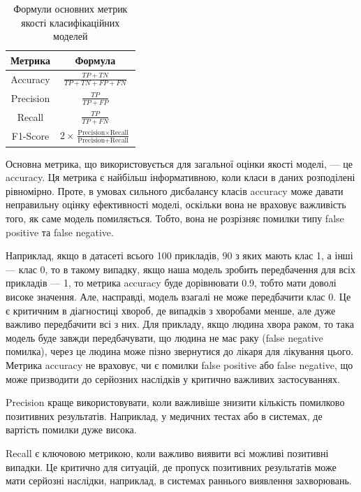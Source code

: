 \begin{table}[ht]
	\setfontsize{14pt}
	\centering
	\begin{tabular}{|c|c|}
		\hline
		Метрика & Формула \\
		\hline
		Accuracy & $\frac{TP + TN}{TP + TN + FP + FN}$ \\
		\hline
		Precision & $\frac{TP}{TP + FP}$ \\
		\hline
		Recall & $\frac{TP}{TP + FN}$ \\
		\hline
		F1-Score & $2 \times \frac{\text{Precision} \times \text{Recall}}{\text{Precision} + \text{Recall}}$ \\
		\hline
	\end{tabular}
	\caption{Формули основних метрик якості класифікаційних моделей}
	\label{tab_metrics}
\end{table}

Основна метрика, що використовується для загальної оцінки якості моделі, — це accuracy. Ця метрика є найбільш інформативною, коли класи в даних розподілені рівномірно. Проте, в умовах сильного дисбалансу класів accuracy може давати неправильну оцінку ефективності моделі, оскільки вона не враховує важливість того, як саме модель помиляється. Тобто, вона не розрізняє помилки типу false positive та false negative. 

Наприклад, якщо в датасеті всього 100 прикладів, 90 з яких мають клас 1, а інші — клас 0, то в такому випадку, якщо наша модель зробить передбачення для всіх прикладів — 1, то метрика accuracy буде дорівнювати 0.9, тобто мати доволі високе значення. Але, насправді, модель взагалі не може передбачити клас 0. Це є критичним в діагностиці хвороб, де випадків з хворобами менше, але дуже важливо передбачити всі з них. Для прикладу, якщо людина хвора раком, то така модель буде завжди передбачувати, що людина не має раку (false negative помилка), через це людина може пізно звернутися до лікаря для лікування цього. Метрика accuracy не враховує, чи є помилки false positive або false negative, що може призводити до серйозних наслідків у критично важливих застосуваннях.

Precision краще використовувати, коли важливіше знизити кількість помилково позитивних результатів. Наприклад, у медичних тестах або в системах, де вартість помилки дуже висока.

Recall є ключовою метрикою, коли важливо виявити всі можливі позитивні випадки. Це критично для ситуацій, де пропуск позитивних результатів може мати серйозні наслідки, наприклад, в системах раннього виявлення захворювань.


